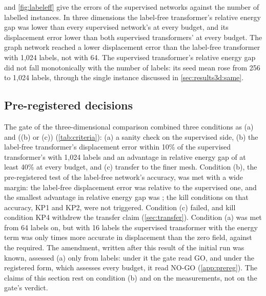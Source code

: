  and \cref{fig:labeleff} give the errors of the supervised networks
against the number of labelled instances. In three dimensions the label-free transformer's
relative energy gap was lower than every supervised network's at every budget, and its
displacement error lower than both supervised transformers' at every budget. The graph
network reached a lower displacement error than the label-free transformer with 1,024
labels, not with 64. The supervised transformer's relative energy gap did not fall
monotonically with the number of labels: its seed mean rose from 256 to 1,024 labels,
through the single instance discussed in \cref{sec:results3d:same}.

\subsection{Pre-registered decisions}\label{sec:results3d:decisions}

The gate of the three-dimensional comparison combined three conditions as (a) and ((b) or
(c)) (\cref{tab:criteria}): (a) a sanity check on the supervised side, (b) the label-free
transformer's displacement error within 10\% of the supervised transformer's with 1,024
labels and an advantage in relative energy gap of at least 40\% at every budget, and (c)
transfer to the finer mesh. Condition (b), the pre-registered test of the label-free
network's accuracy, was met with a wide margin: the label-free displacement error was
\numGTwoParity{} relative to the supervised one, and the smallest advantage in relative
energy gap was \numGTwoAdvMin{}; the kill conditions on that accuracy, KP1 and KP2, were not
triggered. Condition (c) failed, and kill condition KP4 withdrew the transfer claim
(\cref{sec:transfer}). Condition (a) was met from 64 labels on, but with 16 labels the
supervised transformer with the energy term was only \numGTwoSanitySixteen{} times more
accurate in displacement than the zero field, against the \numGTwoSanityX{} required. The
amendment, written after this result of the initial run was known, assessed (a) only from
\numGTwoFloor{} labels: under it the gate read GO, and under the registered form, which
assesses every budget, it read NO-GO (\ref{app:prereg}). The claims of this section rest on
condition (b) and on the measurements, not on the gate's verdict.
